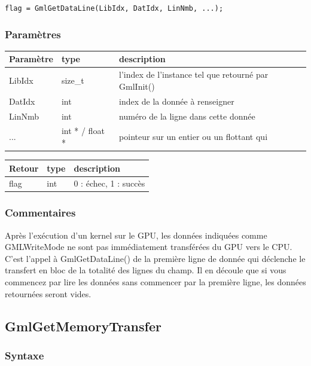 \documentclass[a4paper,12pt]{article}
\begin{document}
{\tt flag = GmlGetDataLine(LibIdx, DatIdx, LinNmb, ...);}

\subsubsection*{Paramètres}

\begin{tabular}{|m{2cm}|m{1.5cm}|m{10.5cm}|}
\hline
Paramètre  & type            & description \\
\hline
LibIdx     & size\_t         & l'index de l'instance tel que retourné par GmlInit() \\
\hline
DatIdx     & int             & index de la donnée à renseigner \\
\hline
LinNmb     & int             & numéro de la ligne dans cette donnée \\
\hline
...        & int * / float * & pointeur sur un entier ou un flottant qui \\
\hline
\end{tabular}

\medskip

\begin{tabular}{|m{2cm}|m{1.5cm}|m{10.5cm}|}
\hline
Retour     & type   & description \\
\hline
flag       & int    & 0 : échec, 1 : succès \\
\hline
\end{tabular}

\subsubsection*{Commentaires}
Après l'exécution d'un kernel sur le GPU, les données indiquées comme GMLWriteMode ne sont pas immédiatement transférées du GPU vers le CPU.
C'est l'appel à GmlGetDataLine() de la première ligne de donnée qui déclenche le transfert en bloc de la totalité des lignes du champ.
Il en découle que si vous commencez par lire les données sans commencer par la première ligne, les données retournées seront vides.


\subsection{GmlGetMemoryTransfer}

\subsubsection*{Syntaxe}
\end{document}
